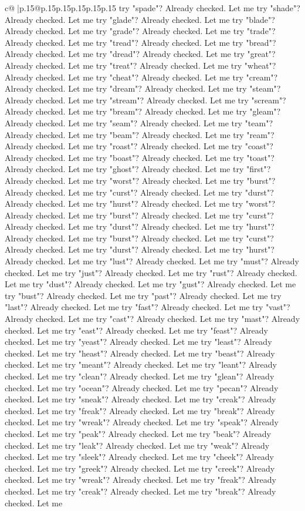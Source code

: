 \documentclass{article}
\begin{document}
{\begin{supertabular}{c@{$\;$}|p{.15\linewidth}@{}p{.15\linewidth}p{.15\linewidth}p{.15\linewidth}p{.15\linewidth}p{.15\linewidth}}
{{{try "spade"? Already checked. Let me try "shade"? Already checked. Let me try "glade"? Already checked. Let me try "blade"? Already checked. Let me try "grade"? Already checked. Let me try "trade"? Already checked. Let me try "tread"? Already checked. Let me try "bread"? Already checked. Let me try "dread"? Already checked. Let me try "great"? Already checked. Let me try "treat"? Already checked. Let me try "wheat"? Already checked. Let me try "cheat"? Already checked. Let me try "cream"? Already checked. Let me try "dream"? Already checked. Let me try "steam"? Already checked. Let me try "stream"? Already checked. Let me try "scream"? Already checked. Let me try "bream"? Already checked. Let me try "gleam"? Already checked. Let me try "seam"? Already checked. Let me try "team"? Already checked. Let me try "beam"? Already checked. Let me try "ream"? Already checked. Let me try "roast"? Already checked. Let me try "coast"? Already checked. Let me try "boast"? Already checked. Let me try "toast"? Already checked. Let me try "ghost"? Already checked. Let me try "first"? Already checked. Let me try "worst"? Already checked. Let me try "burst"? Already checked. Let me try "curst"? Already checked. Let me try "durst"? Already checked. Let me try "hurst"? Already checked. Let me try "worst"? Already checked. Let me try "burst"? Already checked. Let me try "curst"? Already checked. Let me try "durst"? Already checked. Let me try "hurst"? Already checked. Let me try "burst"? Already checked. Let me try "curst"? Already checked. Let me try "durst"? Already checked. Let me try "hurst"? Already checked. Let me try "lust"? Already checked. Let me try "must"? Already checked. Let me try "just"? Already checked. Let me try "rust"? Already checked. Let me try "dust"? Already checked. Let me try "gust"? Already checked. Let me try "bust"? Already checked. Let me try "past"? Already checked. Let me try "last"? Already checked. Let me try "fast"? Already checked. Let me try "vast"? Already checked. Let me try "cast"? Already checked. Let me try "mast"? Already checked. Let me try "east"? Already checked. Let me try "feast"? Already checked. Let me try "yeast"? Already checked. Let me try "least"? Already checked. Let me try "heast"? Already checked. Let me try "beast"? Already checked. Let me try "meant"? Already checked. Let me try "leant"? Already checked. Let me try "clean"? Already checked. Let me try "glean"? Already checked. Let me try "ocean"? Already checked. Let me try "pecan"? Already checked. Let me try "sneak"? Already checked. Let me try "creak"? Already checked. Let me try "freak"? Already checked. Let me try "break"? Already checked. Let me try "wreak"? Already checked. Let me try "speak"? Already checked. Let me try "peak"? Already checked. Let me try "beak"? Already checked. Let me try "leak"? Already checked. Let me try "weak"? Already checked. Let me try "sleek"? Already checked. Let me try "cheek"? Already checked. Let me try "greek"? Already checked. Let me try "creek"? Already checked. Let me try "wreak"? Already checked. Let me try "freak"? Already checked. Let me try "creak"? Already checked. Let me try "break"? Already checked. Let me }}}
\end{supertabular}}
\end{document}
